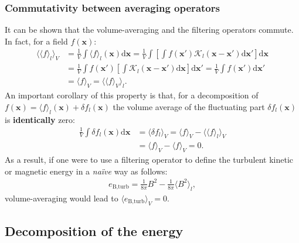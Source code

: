 \documentclass[]{article}
\begin{document}
\subsubsection*{Commutativity between averaging operators}

It can be shown that the volume-averaging and the filtering operators commute. In fact, for a field $f(\bm x)$:
%
\begin{align}
	\langle \langle f \rangle_l \rangle_V &= \frac{1}{V} \int \langle f \rangle_l (\bm x) \mathrm{d} \bm x = \frac{1}{V} \int \left[ \int f(\bm x') \mathcal{K}_l (\bm x - \bm x') \mathrm{d} \bm x' \right] \mathrm{d} \bm x \nonumber \\
	&= \frac{1}{V} \int f(\bm x') \left[ \int  \mathcal{K}_l (\bm x - \bm x') \mathrm{d} \bm x  \right] \mathrm{d} \bm x' = \frac{1}{V} \int f(\bm x')  \mathrm{d} \bm x' \nonumber \\
	&= \langle f  \rangle_V = \langle \langle f \rangle_V \rangle_l.
\end{align}
%
An important corollary of this property is that, for a decomposition of $f(\bm x) = \langle f \rangle_l (\bm x) + \delta f_l (\bm x)$ the volume average of the fluctuating part $\delta f_l (\bm x)$ is \textbf{identically} zero:
%
\begin{align}\label{eq:corollary_naive_energy}
	 \frac{1}{V} \int \delta f_l (\bm x) \mathrm{d} \bm x &= \langle \delta f_l  \rangle_V = \langle f  \rangle_V - \langle \langle f \rangle_l  \rangle_V  \nonumber \\
	 &= \langle f  \rangle_V - \langle f  \rangle_V = 0.
\end{align}
%
As a result, if one were to use a filtering operator to define the turbulent kinetic or magnetic energy in a \textit{na\"{i}ve} way as follows:
%
\begin{align}
	e_{\text{B,turb}} = \frac{1}{8\pi}B^2 - \frac{1}{8\pi} \langle B^2 \rangle_l ,
\end{align}
%
volume-averaging would lead to $\langle e_{\text{B,turb}} \rangle_V = 0$.

\subsection{Decomposition of the energy}
\end{document}
